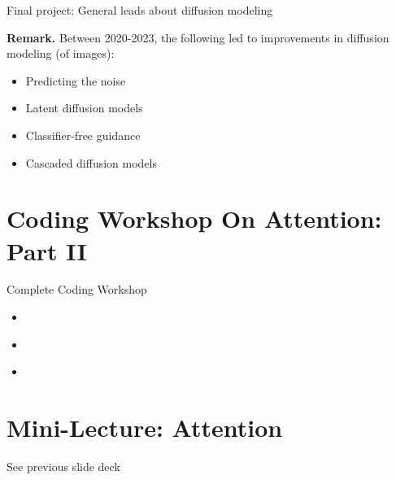 \documentclass[10pt]{beamer}
\begin{document}
\begin{frame}{Final project: General leads about diffusion modeling}

\colorbox{blue!30}{\textbf{Remark.}} Between 2020-2023, the following led to improvements in diffusion modeling (of images):

\begin{itemize}
	\item Predicting the noise \greencheck \pause 
	\item Latent diffusion models  \pause 
	\item Classifier-free guidance 
	\item Cascaded diffusion models 
\end{itemize}

\end{frame}







\section{Coding Workshop On Attention: Part II}

\begin{frame}{Complete Coding Workshop}
\begin{itemize}
\item \href{https://docs.google.com/presentation/d/1_SY-tAbZFY8irih9neKzLfv3miCtsh4p9bxCeoW896U/edit?usp=sharing}{\underline{}}
\item \href{https://docs.google.com/presentation/d/1Ej1u6c1l3iVIl6_jghKfbHAgqC1-_A8fWtkO_3l_5CE/edit?usp=sharing}{\underline{}}
\item \href{https://montanaedu-my.sharepoint.com/:b:/g/personal/t83h237_student_montana_edu/IQAxz5FhInYzSKwS3QhA2V5PASBKxF55_T7uX-_qB83dDtw}{\underline{}}	
\end{itemize}


\end{frame}




\section{Mini-Lecture: Attention}

\begin{frame}[standout]
See previous slide deck
\end{frame}
\end{document}

